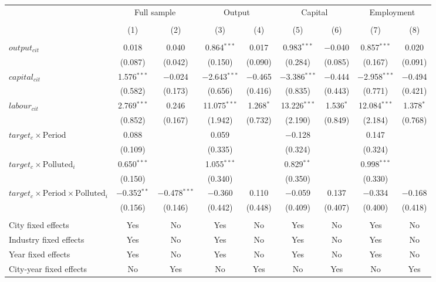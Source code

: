 \documentclass[12pt]{article}
\begin{document}
\begin{table}[!htb]
\begin{adjustbox}{width=\textwidth, totalheight=\baselineskip,keepaspectratio}
\begin{tabular}{@{\extracolsep{5pt}}lcccccccc}
\\[-1.8ex]
            &\multicolumn{2}{c}{Full sample}&\multicolumn{2}{c}{Output}&\multicolumn{2}{c}{Capital}&\multicolumn{2}{c}{Employment}\\
\\[-1.8ex] & (1) & (2) & (3) & (4) & (5) & (6) & (7) & (8)\\ 
\hline \\[-1.8ex] 
  $output_{cit}$ & 0.018 & 0.040 & 0.864$^{***}$ & 0.017 & 0.983$^{***}$ & $-$0.040 & 0.857$^{***}$ & 0.020 \\ 
  & (0.087) & (0.042) & (0.150) & (0.090) & (0.284) & (0.085) & (0.167) & (0.091) \\ 
  $capital_{cit}$ & 1.576$^{***}$ & $-$0.024 & $-$2.643$^{***}$ & $-$0.465 & $-$3.386$^{***}$ & $-$0.444 & $-$2.958$^{***}$ & $-$0.494 \\ 
  & (0.582) & (0.173) & (0.656) & (0.416) & (0.835) & (0.443) & (0.771) & (0.421) \\ 
  $labour_{cit}$ & 2.769$^{***}$ & 0.246 & 11.075$^{***}$ & 1.268$^{*}$ & 13.226$^{***}$ & 1.536$^{*}$ & 12.084$^{***}$ & 1.378$^{*}$ \\ 
  & (0.852) & (0.167) & (1.942) & (0.732) & (2.190) & (0.849) & (2.184) & (0.768) \\ 
   $target_c \times \text{Period}$  & 0.088 &  & 0.059 &  & $-$0.128 &  & 0.147 &  \\ 
  & (0.109) &   & (0.335) &   & (0.324) &   & (0.324) &   \\ 
   $target_c \times \text{Polluted}_i$  & 0.650$^{***}$ &  & 1.055$^{***}$ &  & 0.829$^{**}$ &  & 0.998$^{***}$ &  \\ 
  & (0.150) &   & (0.340) &   & (0.350) &   & (0.330) &   \\ 
   $target_c \times \text{Period} \times \text{Polluted}_i$  & $-$0.352$^{**}$ & $-$0.478$^{***}$ & $-$0.360 & 0.110 & $-$0.059 & 0.137 & $-$0.334 & $-$0.168 \\ 
  & (0.156) & (0.146) & (0.442) & (0.448) & (0.409) & (0.407) & (0.400) & (0.418) \\ 
 \hline \\[-1.8ex] 
City fixed effects & Yes & No & Yes & No & Yes & No & Yes & No \\ 
Industry fixed effects & Yes & No & Yes & No & Yes & No & Yes & No \\ 
Year fixed effects & Yes & No & Yes & No & Yes & No & Yes & No \\ 
City-year fixed effects & No & Yes & No & Yes & No & Yes & No & Yes \\ 

\end{tabular}
\end{adjustbox}
\end{table}
\end{document}
